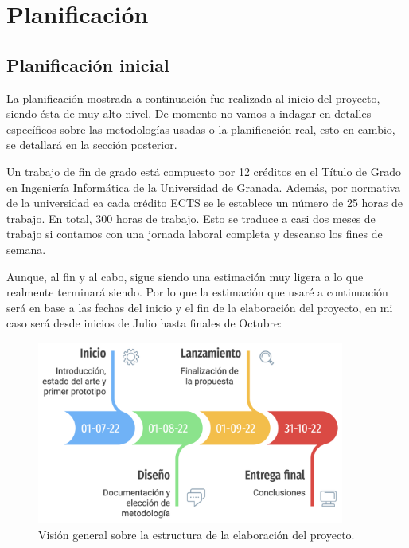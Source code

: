 \chapter{Planificación}\label{ch:planificacion}

\section{Planificación inicial}
La planificación mostrada a continuación fue realizada al inicio del proyecto, siendo ésta de muy alto nivel. De momento no vamos a indagar en detalles específicos sobre las metodologías usadas o la planificación real, esto en cambio, se detallará en la sección posterior.

\vspace{0.3cm}

Un trabajo de fin de grado está compuesto por 12 créditos en el Título de Grado en Ingeniería Informática de la Universidad de Granada. Además, por normativa de la universidad ea cada crédito ECTS se le establece un número de 25 horas de trabajo. En total, 300 horas de trabajo. Esto se traduce a casi dos meses de trabajo si contamos con una jornada laboral completa y descanso los fines de semana.

\vspace{0.3cm}

Aunque, al fin y al cabo, sigue siendo una estimación muy ligera a lo que realmente terminará siendo. Por lo que la estimación que usaré a continuación será en base a las fechas del inicio y el fin de la elaboración del proyecto, en mi caso será desde inicios de Julio hasta finales de Octubre:

\vspace{0.3cm}

\begin{figure}[bth]

    \myfloatalign
    \includegraphics[width=0.9\textwidth]{gfx/plan-simple.png}
    \caption[Planificación inicial del proyecto.]{Visión general sobre la estructura de la elaboración del proyecto.}\label{gfx:plan-simple}

\end{figure}

